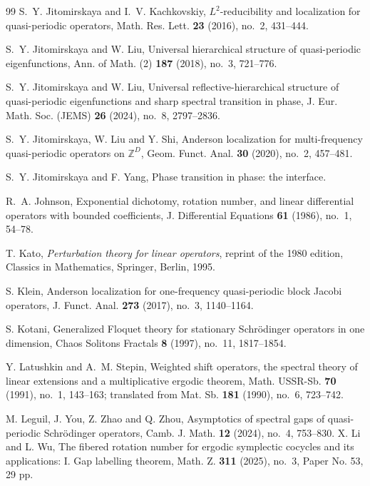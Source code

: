 \documentclass[reqno,11pt]{amsart}
\begin{document}
\begin{thebibliography}{99}
S.~Y. Jitomirskaya and I.~V. Kachkovskiy, $L^2$-reducibility and localization for quasi-periodic operators, Math. Res. Lett. {\bf 23} (2016), no.~2, 431--444.

S.~Y. Jitomirskaya and W. Liu, Universal hierarchical structure of quasi-periodic eigenfunctions, Ann. of Math. (2) {\bf 187} (2018), no.~3, 721--776.

S.~Y. Jitomirskaya and W. Liu, Universal reflective-hierarchical structure of quasi-periodic eigenfunctions and sharp spectral transition in phase, J. Eur. Math. Soc. (JEMS) {\bf 26} (2024), no.~8, 2797--2836.

S.~Y. Jitomirskaya, W. Liu and Y. Shi, Anderson localization for multi-frequency quasi-periodic operators on ${\mathbb Z}^D$, Geom. Funct. Anal. {\bf 30} (2020), no.~2, 457--481.

S.~Y. Jitomirskaya and F. Yang, Phase transition in phase: the interface.

R.~A. Johnson, Exponential dichotomy, rotation number, and linear differential operators with bounded coefficients, J. Differential Equations {\bf 61} (1986), no.~1, 54--78.

T. Kato, {\it Perturbation theory for linear operators}, reprint of the 1980 edition, 
Classics in Mathematics, Springer, Berlin, 1995.

S. Klein, Anderson localization for one-frequency quasi-periodic block Jacobi operators, J. Funct. Anal. {\bf 273} (2017), no.~3, 1140--1164.



S. Kotani, Generalized Floquet theory for stationary Schr\"odinger operators in one dimension, Chaos Solitons Fractals {\bf 8} (1997), no.~11, 1817--1854.


Y. Latushkin and A.~M. Stepin, Weighted shift operators, the spectral theory of linear extensions and a multiplicative ergodic theorem, Math. USSR-Sb. {\bf 70} (1991), no.~1, 143--163; translated from Mat. Sb. {\bf 181} (1990), no.~6, 723--742.


M. Leguil, J. You, Z. Zhao and Q. Zhou, Asymptotics of spectral gaps of quasi-periodic Schr\"odinger operators, Camb. J. Math. {\bf 12} (2024), no.~4, 753--830.
X. Li and L. Wu, The fibered rotation number for ergodic symplectic cocycles and its applications: I. Gap labelling theorem, Math. Z. {\bf 311} (2025), no.~3, Paper No. 53, 29 pp.


\end{thebibliography}
\end{document}
